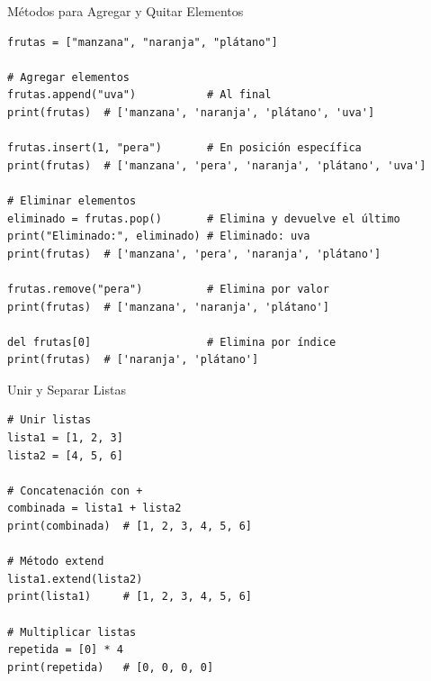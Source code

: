 \documentclass[10pt]{beamer}
\begin{document}
\fi
\begin{frame}[fragile]{Métodos para Agregar y Quitar Elementos}
\begin{verbatim}
frutas = ["manzana", "naranja", "plátano"]

# Agregar elementos
frutas.append("uva")           # Al final
print(frutas)  # ['manzana', 'naranja', 'plátano', 'uva']

frutas.insert(1, "pera")       # En posición específica
print(frutas)  # ['manzana', 'pera', 'naranja', 'plátano', 'uva']

# Eliminar elementos
eliminado = frutas.pop()       # Elimina y devuelve el último
print("Eliminado:", eliminado) # Eliminado: uva
print(frutas)  # ['manzana', 'pera', 'naranja', 'plátano']

frutas.remove("pera")          # Elimina por valor
print(frutas)  # ['manzana', 'naranja', 'plátano']

del frutas[0]                  # Elimina por índice
print(frutas)  # ['naranja', 'plátano']
\end{verbatim}
\end{frame}

\begin{frame}[fragile]{Unir y Separar Listas}
\begin{verbatim}
# Unir listas
lista1 = [1, 2, 3]
lista2 = [4, 5, 6]

# Concatenación con +
combinada = lista1 + lista2
print(combinada)  # [1, 2, 3, 4, 5, 6]

# Método extend
lista1.extend(lista2)
print(lista1)     # [1, 2, 3, 4, 5, 6]

# Multiplicar listas
repetida = [0] * 4
print(repetida)   # [0, 0, 0, 0]


\end{verbatim}
\end{frame}
\end{document}
